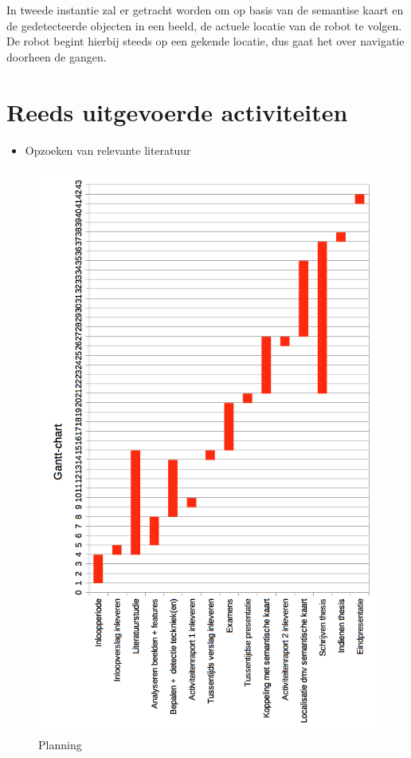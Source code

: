 \documentclass[11pt,a4paper]{article}
\begin{document}
    In tweede instantie zal er getracht worden om op basis van de semantise kaart en de gedetecteerde objecten in een beeld, de actuele locatie van de robot te volgen.
    De robot begint hierbij steeds op een gekende locatie, dus gaat het over navigatie doorheen de gangen.

    \section{Reeds uitgevoerde activiteiten}
        \begin{itemize}
            \item Opzoeken van relevante literatuur~\cite{844076}~\cite{Yi2009ActivesemanticLW}~\cite{7780460}~\cite{Se02mobilerobot}~\cite{semloc}
        \end{itemize}


    \begin{figure}[htbp]
        \centering
        \includegraphics[]{planning.png}
        \caption{Planning}
    \end{figure}

    
    
\end{document}
